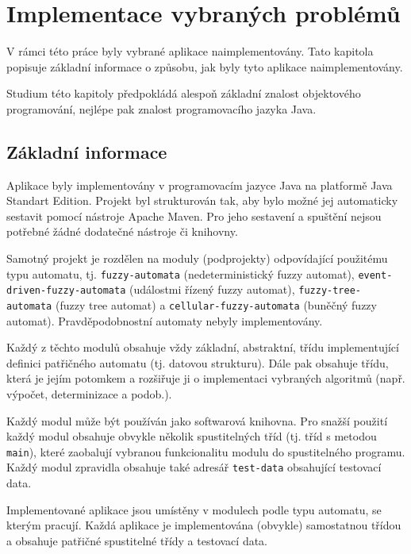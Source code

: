 \section{Implementace vybraných problémů}
V rámci této práce byly vybrané aplikace naimplementovány. Tato kapitola popisuje základní informace o způsobu, jak byly tyto aplikace naimplementovány.

Studium této kapitoly předpokládá alespoň základní znalost objektového programování, nejlépe pak znalost programovacího jazyka Java.

\subsection{Základní informace}
Aplikace byly implementovány v programovacím jazyce Java na platformě Java Standart Edition. Projekt byl strukturován tak, aby bylo možné jej automaticky sestavit pomocí nástroje Apache Maven. Pro jeho sestavení a spuštění nejsou potřebné žádné dodatečné nástroje či knihovny.

Samotný projekt je rozdělen na moduly (podprojekty) odpovídající použitému typu automatu, tj. \verb|fuzzy-automata| (nedeterministický fuzzy automat), \verb|event-driven-fuzzy-automata| (událostmi řízený fuzzy automat), \verb|fuzzy-tree-automata| (fuzzy tree automat) a \verb|cellular-fuzzy-automata| (buněčný fuzzy automat). Pravděpodobnostní automaty nebyly implementovány.

Každý z těchto modulů obsahuje vždy základní, abstraktní, třídu implementující definici patřičného automatu (tj. datovou strukturu). Dále pak obsahuje třídu, která je jejím potomkem a rozšiřuje ji o implementaci vybraných algoritmů (např. výpočet, determinizace a podob.).

Každý modul může být používán jako softwarová knihovna. Pro snažší použití každý modul obsahuje obvykle několik spustitelných tříd (tj. tříd s metodou \verb|main|), které zaobalují vybranou funkcionalitu modulu do spustitelného programu. Každý modul zpravidla obsahuje také adresář \verb|test-data| obsahující testovací data.

Implementované aplikace jsou umístěny v modulech podle typu automatu, se kterým pracují. Každá aplikace je implementována (obvykle) samostatnou třídou a obsahuje patřičné spustitelné třídy a testovací data.

